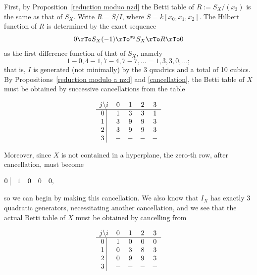 \begin{example}
First, by Proposition~\ref{reduction moduo nzd} the Betti table of $R := S_{X}/(x_{3})$ is the same as that of $S_{X}$. Write $R = \overline S/I$, where $\overline S = k[x_{0},x_{1},x_{2}]$. The Hilbert function of $R$ is determined by the exact sequence
$$
0\rTo S_{X}(-1)\rTo^{x_{3}} S_{X} \rTo R \rTo 0
$$
as the first difference function of that of $S_{X}$, namely
$$
1 -0, 4-1, 7-4, 7-7,\dots = 1,3,3,0,\dots;
$$
that is, $I$ is generated (not minimally) by the 3 quadrics and a total of 10 cubics. By Propositions~\ref{reduction modulo a nzd} and \ref{cancellation}, the Betti table of $X$ must be obtained by successive cancellations
from the table
\begin{small}
$$
\begin{matrix}
j \backslash i &0&1&2&3\\ \hline
\text{0 }\vline &1&3&3&1\\
\text{1 }\vline &3&9&9&3\\
\text{2 }\vline &3&9&9&3\\
\text{3 }\vline &-&-&-&-\\
\end{matrix}
$$
\end{small}
Moreover, since $X$ is not contained in a hyperplane, the zero-th row, after cancellation, must become
\begin{small}
 $
\begin{matrix}
\text{0 }\vline &1&0&0&0\\
\end{matrix},
$
\end{small}
so we can begin by making this cancellation. We also know that $I_{X}$ has exactly 3 quadratic generators, necessitating another cancellation, and we see that the actual Betti table of $X$ must be obtained by
cancelling from
\begin{small}
$$
\begin{matrix}
j \backslash i &0&1&2&3\\ \hline
\text{0 }\vline &1&0&0&0\\
\text{1 }\vline &0&3&8&3\\
\text{2 }\vline &0&9&9&3\\
\text{3 }\vline &-&-&-&-\\
\end{matrix}
$$
\end{small}



\end{example}
